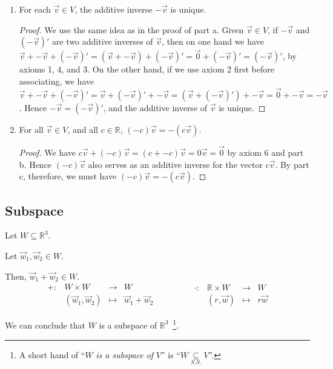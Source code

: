 \documentclass[11pt,fleqn]{book} %
\begin{document}
\begin{proposition}
\begin{enumerate}[label=\alph*)]
\begin{proof}
            Thus, $\forall \vec{v} \in V$, $\underset{\mathbb{F}}{0}\vec{v} = \vec{0}_V$.
        \end{proof}

        \item For each $\vec{v} \in V$, the additive inverse $-\vec{v}$ is unique.

        \begin{proof}
            We use the same idea as in the proof of part a. Given $\vec{v} \in V$, if $-\vec{v}$ and $(-\vec{v})'$ are two additive inverses of $\vec{v}$, then on one hand we have $\vec{v} + -\vec{v}  + (-\vec{v})' = (\vec{v} + -\vec{v}) + (-\vec{v})' = \vec{0} + (-\vec{v})' = (-\vec{v})'$, by axioms 1, 4, and 3. On the other hand, if we use axiom 2 first before associating, we have $\vec{v} + -\vec{v}  + (-\vec{v})' = \vec{v} + (-\vec{v})' + -\vec{v} = (\vec{v} + (-\vec{v})') + -\vec{v} = \vec{0} + -\vec{v} = -\vec{v}$. Hence $-\vec{v} = (-\vec{v})'$, and the additive inverse of $\vec{v}$ is unique.
        \end{proof}

        \item For all $\vec{v} \in V$, and all $c \in \mathbb{R}$, $(-c)\vec{v}  = -(c\vec{v})$.
        \begin{proof}
            We have $c\vec{v} + (-c)\vec{v} = (c + -c)\vec{v} = 0\vec{v} = \vec{0}$ by axiom 6 and part b. Hence $(-c)\vec{v}$ also serves as an additive inverse for the vector $c\vec{v}$. By part c, therefore, we must have $(-c)\vec{v} = -(c\vec{v})$.
        \end{proof}
    \end{enumerate}
\end{proposition}
\setcounter{section}{3}

\subsection{Subspace}
\begin{example}
    Let $W \subseteq \mathbb{R}^3$.

    Let $\vec{w}_1, \vec{w}_2 \in W$.

    Then, $\vec{w}_1 + \vec{w}_2 \in W$.
    $$
        \begin{matrix} +: &W\times W &\to &W \\ &(\vec{w}_1, \vec{w}_2) &\mapsto &\vec{w}_1 + \vec{w}_2 \end{matrix}
        \qquad \qquad
        \begin{matrix} \cdot: &\mathbb{R} \times W &\to &W \\ &(r, \vec{w}) &\mapsto &r\vec{w} \end{matrix}
    $$

    We can conclude that $W$ is a subspace of $\mathbb{R}^3$~\footnote{A short hand of ``$W$ \textit{is a subspace of} $V$'' is ``$W \underset{S.S.}{\subseteq} V$''. }.
\end{example}
\end{document}
